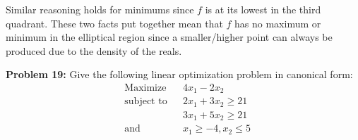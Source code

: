 \documentclass{article}
\begin{document}
\begin{itemize}
\begin{center}
    \end{center}

    Similar reasoning holds for minimums since $f$ is at its lowest in the third quadrant. These two facts put together mean that $f$ has no maximum or minimum in the elliptical region since a smaller/higher point can always be produced due to the density of the reals. 
\end{itemize}
\bigskip

\noindent\textbf{Problem 19:} Give the following linear optimization problem in canonical form:
$$\begin{aligned}
    &{\text{Maximize}}
    &&4x_1-2x_2 \\
    &{\text{subject to}}
    &&2x_1+3x_2\ge21\\
    &
    &&3x_1+5x_2\ge21\\
    &{\text{and}}
    &&x_1\ge-4,x_2\le5
\end{aligned}$$
\medskip
\end{document}
